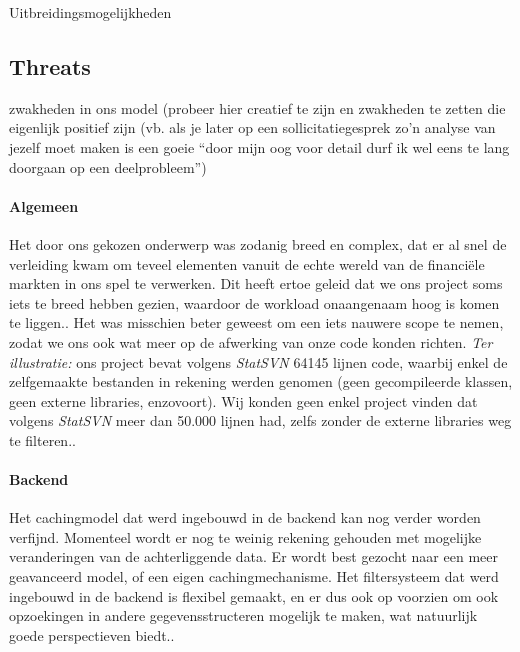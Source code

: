 \todo Uitbreidingsmogelijkheden

\subsection{Threats}

\todo zwakheden in ons model (probeer hier creatief te zijn en zwakheden te zetten die eigenlijk positief zijn (vb. als je later op een sollicitatiegesprek zo'n analyse van jezelf moet maken is een goeie ``door mijn oog voor detail durf ik wel eens te lang doorgaan op een deelprobleem'')

\paragraph{Algemeen} Het door ons gekozen onderwerp was zodanig breed en complex, dat er al snel de verleiding kwam om teveel elementen vanuit de echte wereld van de financi\"ele markten in ons spel te verwerken. Dit heeft ertoe geleid dat we ons project soms iets te breed hebben gezien, waardoor de workload onaangenaam hoog is komen te liggen.. Het was misschien beter geweest om een iets nauwere scope te nemen, zodat we ons ook wat meer op de afwerking van onze code konden richten.
\emph{Ter illustratie: }ons project bevat volgens \emph{StatSVN} 64145 lijnen code, waarbij enkel de zelfgemaakte bestanden in rekening werden genomen (geen gecompileerde klassen, geen externe libraries, enzovoort). Wij konden geen enkel project vinden dat volgens \emph{StatSVN} meer dan 50.000 lijnen had, zelfs zonder de externe libraries weg te filteren..

\paragraph{Backend}
Het cachingmodel dat werd ingebouwd in de backend kan nog verder worden verfijnd. Momenteel wordt er nog te weinig rekening gehouden met mogelijke veranderingen van de achterliggende data. Er wordt best gezocht naar een meer geavanceerd model, of een eigen cachingmechanisme. Het filtersysteem dat werd ingebouwd in de backend is flexibel gemaakt, en er dus ook op voorzien om ook opzoekingen in andere gegevensstructeren mogelijk te maken, wat natuurlijk goede perspectieven biedt..


